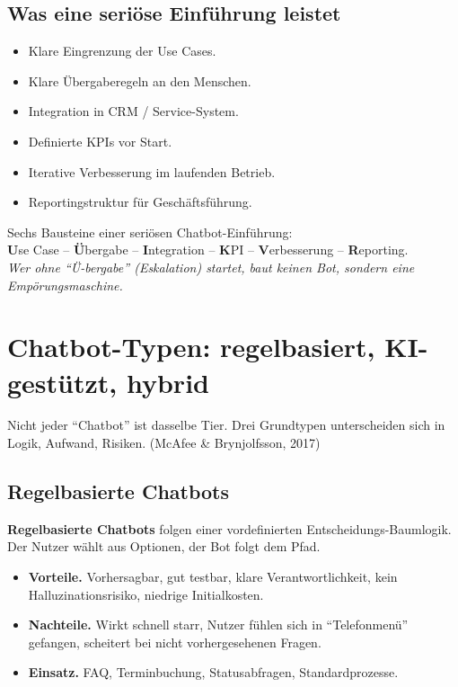 \documentclass[11pt,a4paper,oneside]{article}
\newcommand{\caveatfontfallback}{\itshape}
\newcommand\caveatfont{\caveatfontfallback}%
\newcommand{\akzent}[1]{{\caveatfont\color{lpAmber}#1}}
\newcommand{\fachbegriff}[1]{\textbf{#1}}
\newcommand{\quelle}[1]{{\footnotesize\color{lpGray}(#1)}}
\begin{document}
\subsection{Was eine seriöse Einführung leistet}

\begin{itemize}
  \item Klare Eingrenzung der Use Cases.
  \item Klare Übergaberegeln an den Menschen.
  \item Integration in CRM / Service-System.
  \item Definierte KPIs vor Start.
  \item Iterative Verbesserung im laufenden Betrieb.
  \item Reportingstruktur für Geschäftsführung.
\end{itemize}

\begin{eselsbox}[Eselsbrücke: \akzent{U-Ü-I-K-V-R}]
Sechs Bausteine einer seriösen Chatbot-Einführung:\\[2pt]
\textbf{U}se Case -- \textbf{Ü}bergabe -- \textbf{I}ntegration -- \textbf{K}PI -- \textbf{V}erbesserung -- \textbf{R}eporting.\\[2pt]
\emph{Wer ohne ``Ü-bergabe'' (Eskalation) startet, baut keinen Bot, sondern eine Empörungsmaschine.}
\end{eselsbox}

\section{Chatbot-Typen: regelbasiert, KI-gestützt, hybrid}

Nicht jeder ``Chatbot'' ist dasselbe Tier. Drei Grundtypen unterscheiden sich in Logik, Aufwand, Risiken. \quelle{McAfee \& Brynjolfsson, 2017}

\subsection{Regelbasierte Chatbots}

\fachbegriff{Regelbasierte Chatbots} folgen einer vordefinierten Entscheidungs-Baumlogik. Der Nutzer wählt aus Optionen, der Bot folgt dem Pfad.

\begin{itemize}
  \item \textbf{Vorteile.} Vorhersagbar, gut testbar, klare Verantwortlichkeit, kein Halluzinationsrisiko, niedrige Initialkosten.
  \item \textbf{Nachteile.} Wirkt schnell starr, Nutzer fühlen sich in ``Telefonmenü'' gefangen, scheitert bei nicht vorhergesehenen Fragen.
  \item \textbf{Einsatz.} FAQ, Terminbuchung, Statusabfragen, Standardprozesse.
\end{itemize}
\end{document}
